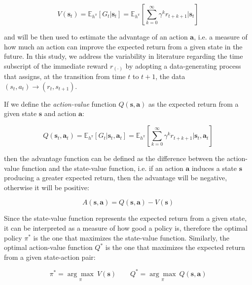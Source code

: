 \begin{equation}
    V(\mathbf{s}_t) = \mathbb{E} _{h^{\pi}} \left[ G _t | \mathbf{s} _t \right] = \mathbb{E} _{h^{\pi}} \left[ \sum ^{\infty} _{k = 0} \gamma ^k r _{t+k+1} | \mathbf{s} _t \right]
\end{equation}

and will be then used to estimate the advantage of an action $\mathbf{a}$, i.e. a measure of how much an action can improve the expected return from a given state in the future. In this study, we address the variability in literature regarding the time subscript of the immediate reward $r_{(\cdot)}$ by adopting a data-generating process that assigns, at the transition from time $t$ to $t+1$, the data $(s_t, a_t) \rightarrow (r_t, s_{t+1})$.

If we define the \textit{action-value} function $Q(\mathbf{s}, \mathbf{a})$ as the expected return from a given state $\mathbf{s}$ and action $\mathbf{a}$:

\begin{equation}
    Q(\mathbf{s}_t, \mathbf{a}_t) = \mathbb{E} _{h^{\pi}} \left[ G _t | \mathbf{s} _t, \mathbf{a} _t \right] = \mathbb{E} _{h^{\pi}} \left[ \sum ^{\infty} _{k = 0} \gamma ^k r _{t+k+1} | \mathbf{s} _t, \mathbf{a} _t \right]
\end{equation}

then the advantage function can be defined as the difference between the action-value function and the state-value function, i.e. if an action $\mathbf{a}$ induces a state $\mathbf{s}$ producing a greater expected return, then the advantage will be negative, otherwise it will be positive:

\begin{equation}
    A (\mathbf{s}, \mathbf{a}) = Q (\mathbf{s}, \mathbf{a}) - V (\mathbf{s})
\end{equation}

Since the state-value function represents the expected return from a given state, it can be interpreted as a measure of how good a policy is, therefore the optimal policy $\pi ^*$ is the one that maximizes the state-value function. Similarly, the optimal action-value function $Q ^*$ is the one that maximizes the expected return from a given state-action pair:

\begin{equation}
    \pi ^* = \underset{\pi}{\arg\max} \ V (\mathbf{s}) \qquad Q ^* = \underset{\pi}{\arg\max} \ Q (\mathbf{s}, \mathbf{a})
\end{equation}

